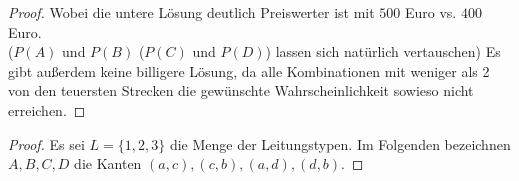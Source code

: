 \documentclass[a4paper]{scrartcl}
\begin{document}
\begin{enumerate}[label=\bfseries\arabic*.]
\begin{proof}
                   
                    Wobei die untere Lösung deutlich Preiswerter ist mit $500$ Euro vs. $400$ Euro.\\
                    ($P(A)$ und $P(B)$ ($P(C)$ und $P(D)$) lassen sich natürlich vertauschen)
                    Es gibt außerdem keine 
                    billigere Lösung, da alle Kombinationen mit weniger als 2 von den 
                    teuersten Strecken die gewünschte Wahrscheinlichkeit sowieso nicht erreichen.    
                \end{proof}

             

                \begin{proof}
                    Es sei $L = \{1, 2, 3\}$ die Menge der Leitungstypen.
                    Im Folgenden bezeichnen $A, B, C, D$ die Kanten
                    $(a, c), (c, b), (a, d), (d, b)$.


\end{proof}
\end{enumerate}
\end{document}
